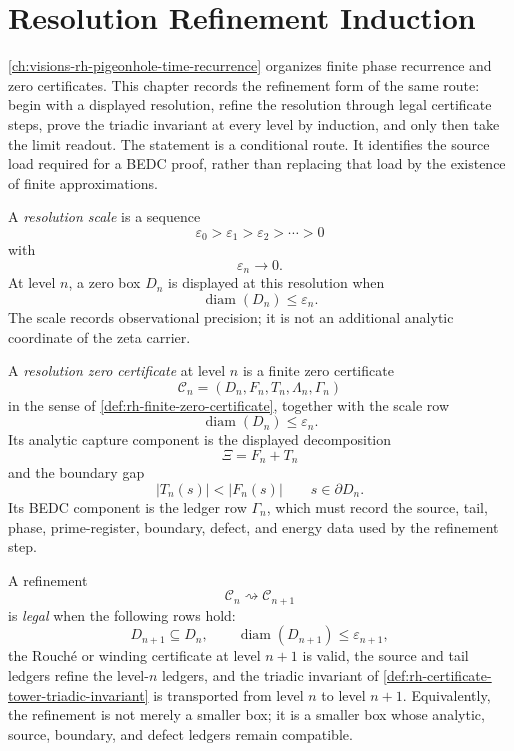 \chapter{Resolution Refinement Induction}
\label{ch:visions-rh-resolution-refinement-induction}

\autoref{ch:visions-rh-pigeonhole-time-recurrence} organizes finite
phase recurrence and zero certificates. This chapter records the
refinement form of the same route: begin with a displayed resolution,
refine the resolution through legal certificate steps, prove the
triadic invariant at every level by induction, and only then take the
limit readout. The statement is a conditional route. It identifies the
source load required for a BEDC proof, rather than replacing that load by
the existence of finite approximations.

\begin{definition}
\label{def:rh-resolution-scale}
A \emph{resolution scale} is a sequence
$$
\varepsilon_0>\varepsilon_1>\varepsilon_2>\cdots>0
$$
with
$$
\varepsilon_n\to0.
$$
At level $n$, a zero box $D_n$ is displayed at this resolution when
$$
\operatorname{diam}(D_n)\le\varepsilon_n.
$$
The scale records observational precision; it is not an additional
analytic coordinate of the zeta carrier.
\end{definition}

\begin{definition}
\label{def:rh-resolution-zero-certificate}
A \emph{resolution zero certificate} at level $n$ is a finite zero
certificate
$$
\mathcal C_n=(D_n,F_n,T_n,\Lambda_n,\Gamma_n)
$$
in the sense of \autoref{def:rh-finite-zero-certificate}, together with
the scale row
$$
\operatorname{diam}(D_n)\le\varepsilon_n.
$$
Its analytic capture component is the displayed decomposition
$$
\Xi=F_n+T_n
$$
and the boundary gap
$$
|T_n(s)|<|F_n(s)|
\qquad
s\in\partial D_n.
$$
Its BEDC component is the ledger row $\Gamma_n$, which must record the
source, tail, phase, prime-register, boundary, defect, and energy data
used by the refinement step.
\end{definition}

\begin{definition}
\label{def:rh-legal-resolution-refinement}
A refinement
$$
\mathcal C_n\rightsquigarrow\mathcal C_{n+1}
$$
is \emph{legal} when the following rows hold:
$$
D_{n+1}\subseteq D_n,
\qquad
\operatorname{diam}(D_{n+1})\le\varepsilon_{n+1},
$$
the Rouch\'e or winding certificate at level $n+1$ is valid, the source
and tail ledgers refine the level-$n$ ledgers, and the triadic invariant
of \autoref{def:rh-certificate-tower-triadic-invariant} is transported
from level $n$ to level $n+1$. Equivalently, the refinement is not merely
a smaller box; it is a smaller box whose analytic, source, boundary, and
defect ledgers remain compatible.
\end{definition}

